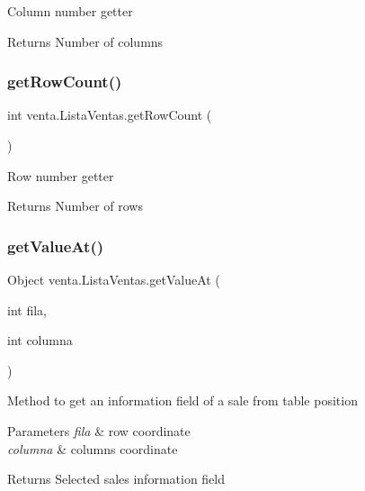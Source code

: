 Column number getter \begin{DoxyReturn}{Returns}
Number of columns 
\end{DoxyReturn}
\mbox{\label{classventa_1_1_lista_ventas_a6c9b22b51a3571a01462073c6272cf0b}} 
\subsubsection{\texorpdfstring{get\+Row\+Count()}{getRowCount()}}
{\footnotesize\ttfamily int venta.\+Lista\+Ventas.\+get\+Row\+Count (\begin{DoxyParamCaption}{ }\end{DoxyParamCaption})\hspace{0.3cm}{\ttfamily [inline]}}

Row number getter \begin{DoxyReturn}{Returns}
Number of rows 
\end{DoxyReturn}
\mbox{\label{classventa_1_1_lista_ventas_a49bbca6b55f15602ea06e0401ae84792}} 
\subsubsection{\texorpdfstring{get\+Value\+At()}{getValueAt()}}
{\footnotesize\ttfamily Object venta.\+Lista\+Ventas.\+get\+Value\+At (\begin{DoxyParamCaption}\item[{int}]{fila,  }\item[{int}]{columna }\end{DoxyParamCaption})\hspace{0.3cm}{\ttfamily [inline]}}

Method to get an information field of a sale from table position 
\begin{DoxyParams}{Parameters}
{\em fila} & row coordinate \\
\hline
{\em columna} & columns coordinate \\
\hline
\end{DoxyParams}
\begin{DoxyReturn}{Returns}
Selected sales\textquotesingle{} information field 
\end{DoxyReturn}
\mbox{\label{classventa_1_1_lista_ventas_ae3dd8941eee7b0e14309add4764d3d1a}} 
